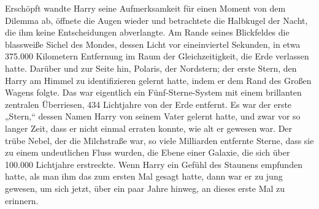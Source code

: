 Erschöpft wandte Harry seine Aufmerksamkeit für einen Moment von dem Dilemma ab, öffnete die Augen wieder und betrachtete die Halbkugel der Nacht, die ihm keine Entscheidungen abverlangte.
Am Rande seines Blickfeldes die blassweiße Sichel des Mondes, dessen Licht vor eineinviertel Sekunden, in etwa 375.000 Kilometern Entfernung im Raum der Gleichzeitigkeit, die Erde verlassen hatte.
Darüber und zur Seite hin, Polaris, der Nordstern; der erste Stern, den Harry am Himmel zu identifizieren gelernt hatte, indem er dem Rand des Großen Wagens folgte. Das war eigentlich ein Fünf-Sterne-System mit einem brillanten zentralen Überriesen, 434 Lichtjahre von der Erde entfernt. Es war der erste „Stern,“ dessen Namen Harry von seinem Vater gelernt hatte, und zwar vor so langer Zeit, dass er nicht einmal erraten konnte, wie alt er gewesen war.
Der trübe Nebel, der die Milchstraße war, so viele Milliarden entfernte Sterne, dass sie zu einem undeutlichen Fluss wurden, die Ebene einer Galaxie, die sich über 100.000 Lichtjahre erstreckte. Wenn Harry ein Gefühl des Staunens empfunden hatte, als man ihm das zum ersten Mal gesagt hatte, dann war er zu jung gewesen, um sich jetzt, über ein paar Jahre hinweg, an dieses erste Mal zu erinnern.

